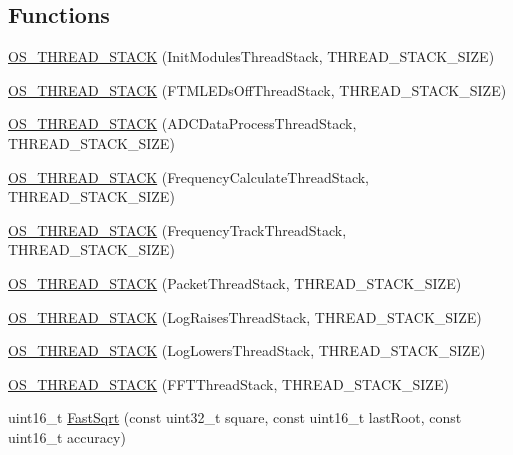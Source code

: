 \subsection*{Functions}
\begin{DoxyCompactItemize}
\item 
\hyperlink{group__main__module_gac2875955d67e96abf6cfa8aaad5e9f75}{O\+S\+\_\+\+T\+H\+R\+E\+A\+D\+\_\+\+S\+T\+A\+C\+K} (Init\+Modules\+Thread\+Stack, T\+H\+R\+E\+A\+D\+\_\+\+S\+T\+A\+C\+K\+\_\+\+S\+I\+Z\+E)
\item 
\hyperlink{group__main__module_gac1a673b52c05b40551c4b7c36b036a91}{O\+S\+\_\+\+T\+H\+R\+E\+A\+D\+\_\+\+S\+T\+A\+C\+K} (F\+T\+M\+L\+E\+Ds\+Off\+Thread\+Stack, T\+H\+R\+E\+A\+D\+\_\+\+S\+T\+A\+C\+K\+\_\+\+S\+I\+Z\+E)
\item 
\hyperlink{group__main__module_ga3d78ba9c55003ce5ad698ede23365938}{O\+S\+\_\+\+T\+H\+R\+E\+A\+D\+\_\+\+S\+T\+A\+C\+K} (A\+D\+C\+Data\+Process\+Thread\+Stack, T\+H\+R\+E\+A\+D\+\_\+\+S\+T\+A\+C\+K\+\_\+\+S\+I\+Z\+E)
\item 
\hyperlink{group__main__module_ga299162ad5226ebb9eaae8642cd049698}{O\+S\+\_\+\+T\+H\+R\+E\+A\+D\+\_\+\+S\+T\+A\+C\+K} (Frequency\+Calculate\+Thread\+Stack, T\+H\+R\+E\+A\+D\+\_\+\+S\+T\+A\+C\+K\+\_\+\+S\+I\+Z\+E)
\item 
\hyperlink{group__main__module_ga5d61515ec758c7da103eb0634374a226}{O\+S\+\_\+\+T\+H\+R\+E\+A\+D\+\_\+\+S\+T\+A\+C\+K} (Frequency\+Track\+Thread\+Stack, T\+H\+R\+E\+A\+D\+\_\+\+S\+T\+A\+C\+K\+\_\+\+S\+I\+Z\+E)
\item 
\hyperlink{group__main__module_gab4c1c0cd94088cbbb7b7caa74232e2b8}{O\+S\+\_\+\+T\+H\+R\+E\+A\+D\+\_\+\+S\+T\+A\+C\+K} (Packet\+Thread\+Stack, T\+H\+R\+E\+A\+D\+\_\+\+S\+T\+A\+C\+K\+\_\+\+S\+I\+Z\+E)
\item 
\hyperlink{group__main__module_ga5ef089d197406620e5dc5ca788c05565}{O\+S\+\_\+\+T\+H\+R\+E\+A\+D\+\_\+\+S\+T\+A\+C\+K} (Log\+Raises\+Thread\+Stack, T\+H\+R\+E\+A\+D\+\_\+\+S\+T\+A\+C\+K\+\_\+\+S\+I\+Z\+E)
\item 
\hyperlink{group__main__module_ga69af505fc5a4bc3fa2ee2670b0941d8f}{O\+S\+\_\+\+T\+H\+R\+E\+A\+D\+\_\+\+S\+T\+A\+C\+K} (Log\+Lowers\+Thread\+Stack, T\+H\+R\+E\+A\+D\+\_\+\+S\+T\+A\+C\+K\+\_\+\+S\+I\+Z\+E)
\item 
\hyperlink{group__main__module_gaaaeda514c0e6fb1f52cba19cf90391dd}{O\+S\+\_\+\+T\+H\+R\+E\+A\+D\+\_\+\+S\+T\+A\+C\+K} (F\+F\+T\+Thread\+Stack, T\+H\+R\+E\+A\+D\+\_\+\+S\+T\+A\+C\+K\+\_\+\+S\+I\+Z\+E)
\item 
uint16\+\_\+t \hyperlink{group__main__module_gac1aa048780b8b9b1ca0afc96a02c8d0b}{Fast\+Sqrt} (const uint32\+\_\+t square, const uint16\+\_\+t last\+Root, const uint16\+\_\+t accuracy)

\end{DoxyCompactItemize}
